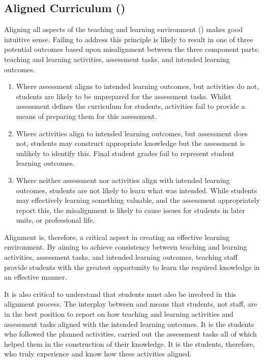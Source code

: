 
\subsection{Aligned Curriculum ()} %
\label{sub:disc_aligned_curriculum}

Aligning all aspects of the teaching and learning environment () makes good intuitive sense. Failing to address this principle is likely to result in one of three potential outcomes based upon misalignment between the three component parts: teaching and learning activities, assessment tasks, and intended learning outcomes.

\begin{enumerate}
	\item Where assessment aligns to intended learning outcomes, but activities do not, students are likely to be unprepared for the assessment tasks. Whilst assessment defines the curriculum for students, activities fail to provide a means of preparing them for this assessment. 
	\item Where activities align to intended learning outcomes, but assessment does not, students may construct appropriate knowledge but the assessment is unlikely to identify this. Final student grades fail to represent student learning outcomes. 
	\item Where neither assessment nor activities align with intended learning outcomes, students are not likely to learn what was intended. While students may effectively learning something valuable, and the assessment appropriately report this, the misalignment is likely to cause issues for students in later units, or professional life.
\end{enumerate}

Alignment is, therefore, a critical aspect in creating an effective learning environment. By aiming to achieve consistency between teaching and learning activities, assessment tasks, and intended learning outcomes, teaching staff provide students with the greatest opportunity to learn the required knowledge in an effective manner. 

It is also critical to understand that students must also be involved in this alignment process. The interplay between  and  means that students, not staff, are in the best position to report on how teaching and learning activities and assessment tasks aligned with the intended learning outcomes. It is the students who followed the planned activities, carried out the assessment tasks all of which helped them in the construction of their knowledge. It is the students, therefore, who truly experience and know how these activities aligned.

